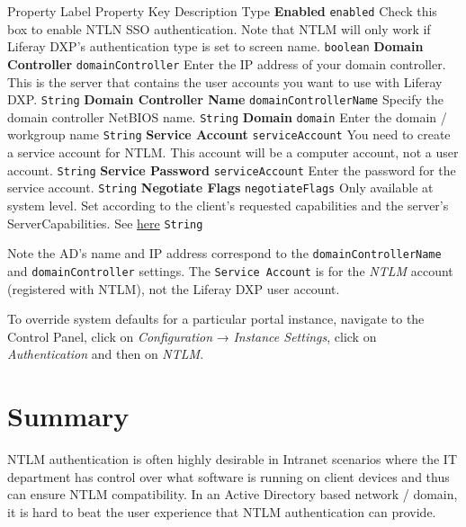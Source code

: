 Property Label \textbar{} Property Key \textbar{} Description \textbar{}
Type \textbf{Enabled} \textbar{} \texttt{enabled} \textbar{} Check this
box to enable NTLN SSO authentication. Note that NTLM will only work if
Liferay DXP's authentication type is set to screen name. \textbar{}
\texttt{boolean} \textbf{Domain Controller} \textbar{}
\texttt{domainController} \textbar{} Enter the IP address of your domain
controller. This is the server that contains the user accounts you want
to use with Liferay DXP. \textbar{} \texttt{String} \textbf{Domain
Controller Name} \textbar{} \texttt{domainControllerName} \textbar{}
Specify the domain controller NetBIOS name. \textbar{} \texttt{String}
\textbf{Domain} \textbar{} \texttt{domain} \textbar{} Enter the domain /
workgroup name \textbar{} \texttt{String} \textbf{Service Account}
\textbar{} \texttt{serviceAccount} \textbar{} You need to create a
service account for NTLM. This account will be a computer account, not a
user account. \textbar{} \texttt{String} \textbf{Service Password}
\textbar{} \texttt{serviceAccount} \textbar{} Enter the password for the
service account. \textbar{} \texttt{String} \textbf{Negotiate Flags}
\textbar{} \texttt{negotiateFlags} \textbar{} Only available at system
level. Set according to the client's requested capabilities and the
server's ServerCapabilities. See
\href{http://msdn.microsoft.com/en-us/library/cc717152\%28v=PROT.10\%29.aspx}{here}
\textbar{} \texttt{String}

Note the AD's name and IP address correspond to the
\texttt{domainControllerName} and \texttt{domainController} settings.
The \texttt{Service\ Account} is for the \emph{NTLM} account (registered
with NTLM), not the Liferay DXP user account.

To override system defaults for a particular portal instance, navigate
to the Control Panel, click on \emph{Configuration} → \emph{Instance
Settings}, click on \emph{Authentication} and then on \emph{NTLM}.

\section{Summary}\label{summary-2}

NTLM authentication is often highly desirable in Intranet scenarios
where the IT department has control over what software is running on
client devices and thus can ensure NTLM compatibility. In an Active
Directory based network / domain, it is hard to beat the user experience
that NTLM authentication can provide.

